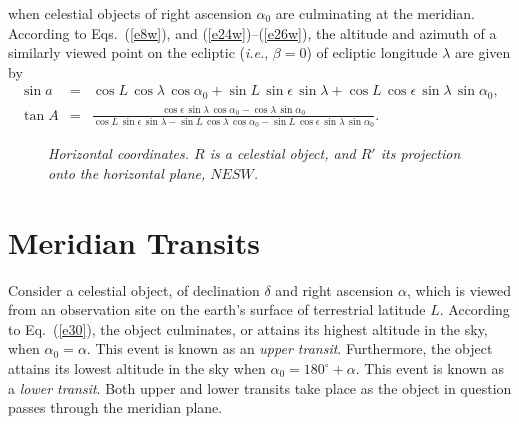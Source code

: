 when celestial objects of right ascension $\alpha_0$ are culminating at the meridian.
According to Eqs.~(\ref{e8w}), and (\ref{e24w})--(\ref{e26w}), 
the altitude and azimuth of a similarly viewed point on the ecliptic ({\em i.e.}, $\beta=0$) of ecliptic
longitude $\lambda$ are given by
\begin{eqnarray}\label{e32}
\sin a &=& \cos L\,\cos\lambda\,\cos \alpha_0+ \sin L\,\sin\epsilon\,\sin \lambda
+ \cos L\,\cos\epsilon\,\sin\lambda\,\sin \alpha_0,\\[0.5ex]
\tan A &=& \frac{\cos\epsilon\,\sin\lambda\,\cos \alpha_0-\cos\lambda\,\sin \alpha_0}
{\cos L\,\sin\epsilon\,\sin \lambda - \sin L\,\cos\lambda\,\cos \alpha_0-\sin L\,\cos\epsilon\,\sin\lambda\,\sin \alpha_0}.\label{e33}
\end{eqnarray}

\begin{figure}
\epsfysize=3in
\centerline{}
\caption[{\em Horizontal coordinates.}]{\em Horizontal coordinates. $R$ is a celestial object, and
$R'$ its projection onto the horizontal plane, $NESW$.}\label{f9}
\end{figure}

\section{Meridian Transits}
Consider a celestial object, of declination $\delta$ and right ascension $\alpha$, which is viewed from an
observation site on the earth's surface of terrestrial latitude $L$. According to Eq.~(\ref{e30}), the object culminates, or attains its highest
altitude in the sky, when $\alpha_0=\alpha$. This event is known as an {\em upper transit}. 
Furthermore, the object attains its lowest altitude in the sky when $\alpha_0=180^\circ + \alpha$.
This event is known as a {\em lower transit}. Both upper and lower
transits take place as the object in question passes through the meridian plane.

